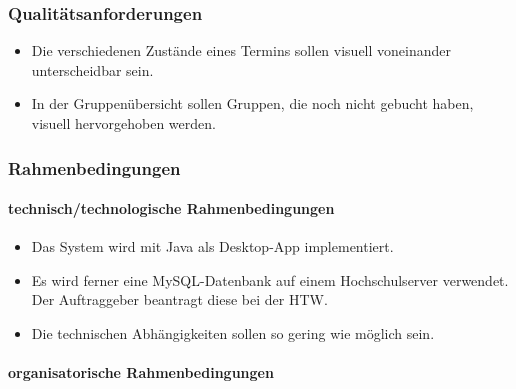 \documentclass[]{article}
\providecommand{\tightlist}{%
  \setlength{\itemsep}{0pt}\setlength{\parskip}{0pt}}
\let\oldparagraph\paragraph
\renewcommand{\paragraph}[1]{\oldparagraph{#1}\mbox{}}
\begin{document}
\hypertarget{qualituxe4tsanforderungen}{%
\subsubsection{Qualitätsanforderungen}\label{qualituxe4tsanforderungen}}

\begin{itemize}
\tightlist
\item
  Die verschiedenen Zustände eines Termins sollen visuell voneinander
  unterscheidbar sein.
\item
  In der Gruppenübersicht sollen Gruppen, die noch nicht gebucht haben,
  visuell hervorgehoben werden.
\end{itemize}

\hypertarget{rahmenbedingungen}{%
\subsubsection{Rahmenbedingungen}\label{rahmenbedingungen}}

\hypertarget{technischtechnologische-rahmenbedingungen}{%
\paragraph{technisch/technologische
Rahmenbedingungen}\label{technischtechnologische-rahmenbedingungen}}

\begin{itemize}
\tightlist
\item
  Das System wird mit Java als Desktop-App implementiert.
\item
  Es wird ferner eine MySQL-Datenbank auf einem Hochschulserver
  verwendet. Der Auftraggeber beantragt diese bei der HTW.
\item
  Die technischen Abhängigkeiten sollen so gering wie möglich sein.
\end{itemize}

\hypertarget{organisatorische-rahmenbedingungen}{%
\paragraph{organisatorische
Rahmenbedingungen}\label{organisatorische-rahmenbedingungen}}
\end{document}
